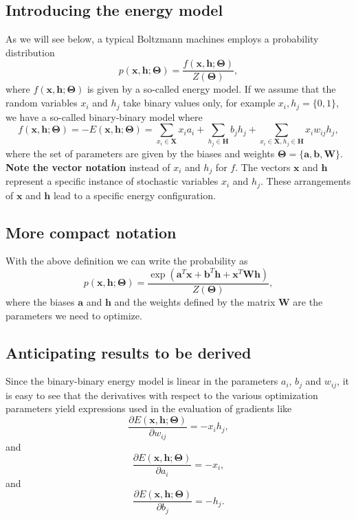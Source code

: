 \documentclass[%
oneside,                 %
final,                   %
10pt]{article}
\begin{document}
\subsection{Introducing the energy model}

As we will see below, a typical Boltzmann machines employs a probability distribution
\[
p(\bm{x},\bm{h};\bm{\Theta}) = \frac{f(\bm{x},\bm{h};\bm{\Theta})}{Z(\bm{\Theta})},
\]
where $f(\bm{x},\bm{h};\bm{\Theta})$ is given by a so-called energy model. If we assume that the random variables $x_i$ and $h_j$ take binary values only, for example $x_i,h_j=\{0,1\}$, we have a so-called binary-binary model where
\[
f(\bm{x},\bm{h};\bm{\Theta})=-E(\bm{x}, \bm{h};\bm{\Theta}) = \sum_{x_i\in \bm{X}} x_i a_i+\sum_{h_j\in \bm{H}} b_j h_j + \sum_{x_i\in \bm{X},h_j\in\bm{H}} x_i w_{ij} h_j,
\]
where the set of parameters are given by the biases and weights $\bm{\Theta}=\{\bm{a},\bm{b},\bm{W}\}$.
\textbf{Note the vector notation} instead of $x_i$ and $h_j$ for $f$. The vectors $\bm{x}$ and $\bm{h}$ represent a specific instance of stochastic variables $x_i$ and $h_j$. These arrangements of $\bm{x}$ and $\bm{h}$ lead to a specific energy configuration.

\subsection{More compact notation}

With the above definition we can write the probability as
\[
p(\bm{x},\bm{h};\bm{\Theta}) = \frac{\exp{(\bm{a}^T\bm{x}+\bm{b}^T\bm{h}+\bm{x}^T\bm{W}\bm{h})}}{Z(\bm{\Theta})},
\]
where the biases $\bm{a}$ and $\bm{h}$ and the weights defined by the matrix $\bm{W}$ are the parameters we need to optimize.

\subsection{Anticipating results to be derived}

Since the binary-binary energy model is linear in the parameters $a_i$, $b_j$ and
$w_{ij}$, it is easy to see that the derivatives with respect to the
various optimization parameters yield expressions used in the
evaluation of gradients like
\[
\frac{\partial E(\bm{x}, \bm{h};\bm{\Theta})}{\partial w_{ij}}=-x_ih_j,
\]
and
\[
\frac{\partial E(\bm{x}, \bm{h};\bm{\Theta})}{\partial a_i}=-x_i,
\]
and
\[
\frac{\partial E(\bm{x}, \bm{h};\bm{\Theta})}{\partial b_j}=-h_j.
\]
\end{document}

